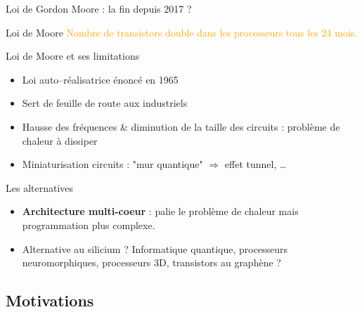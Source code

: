 \documentclass[handout]{beamer}
\begin{document}
\begin{frame}[fragile]{Loi de Gordon Moore : la fin depuis 2017 ?}

\begin{block}{Loi de Moore}
\textcolor{orange}{Nombre de transistors double dans les processeurs tous les 24 mois.}
\end{block}

\begin{block}{Loi de Moore et ses limitations}
\begin{itemize}
 \item Loi auto--réalisatrice énoncé en 1965 
 \item Sert de feuille de route aux industriels
 \item Hausse des fréquences \& diminution de la taille des circuits : \alert{problème de chaleur à dissiper}
 \item Miniaturisation circuits : "mur quantique" $\Rightarrow$ effet tunnel, \ldots
\end{itemize}
\end{block}

\begin{block}{Les alternatives}
\begin{itemize}
 \item \textbf{Architecture multi-coeur}  : palie le problème de chaleur mais programmation plus complexe.
 \item Alternative au silicium ? Informatique quantique, processeurs neuromorphiques, processeurs 3D, transistors au graphène ?
\end{itemize} 
\end{block}

\end{frame}

\subsection{Motivations}
\end{document}
